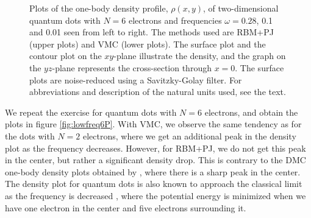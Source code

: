\begin{figure}
	\hspace{0.1cm}
	\hspace{-0.cm}
	\hspace{-0.cm}
	
	\caption{Plots of the one-body density profile, $\rho(x, y)$, of two-dimensional quantum dots with $N=6$ electrons and frequencies $\omega=0.28$, 0.1 and 0.01 seen from left to right. The methods used are RBM+PJ (upper plots) and VMC (lower plots). The surface plot and the contour plot on the $xy$-plane illustrate the density, and the graph on the $yz$-plane represents the cross-section through $x=0$. The surface plots are noise-reduced using a Savitzky-Golay filter. For  abbreviations and description of the natural units used, see the text.}
	\label{fig:lowfreq6P}
\end{figure}

We repeat the exercise for quantum dots with $N=6$ electrons, and obtain the plots in figure \eqref{fig:lowfreq6P}. With VMC, we observe the same tendency as for the dots with $N=2$ electrons, where we get an additional peak in the density plot as the frequency decreases. However, for RBM+PJ, we do not get this peak in the center, but rather a significant density drop. This is contrary to the DMC one-body density plots obtained by \citet{hogberget_quantum_2013}, where there is a sharp peak in the center. The density plot for quantum dots is also known to approach the classical limit as the frequency is decreased \supercite{ghosal_incipient_2007}, where the potential energy is minimized when we have one electron in the center and five electrons surrounding it.

